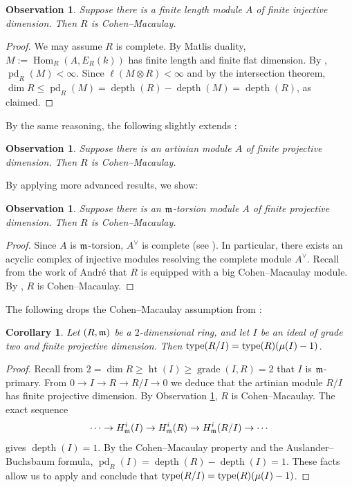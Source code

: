 \documentclass[10. pt,a4paper]{amsart}
\newtheorem{corollary}[theorem]{Corollary}
\newtheorem{observation}[theorem]{Observation}
\theoremstyle{definition}
\theoremstyle{remark}
\newcommand{\pd}{\operatorname{pd}}
\newcommand{\Hom}{\operatorname{Hom}}
\newcommand{\depth}{\operatorname{depth}}
\newcommand{\fm}{\frak{m}}
\begin{document}
\begin{observation}
	Suppose there is a finite length module $A$ of finite injective dimension. Then $R$ is Cohen--Macaulay.
\end{observation}

\begin{proof}
	We may assume $R$ is complete. By Matlis duality, $M := \Hom_R(A, E_R(k))$ has finite length and finite flat dimension. By \cite{GR}, $\pd_R(M) < \infty$. Since $\ell(M \otimes R) < \infty$ and by the intersection theorem, $\dim R \leq \pd_R(M) = \depth(R) - \depth(M) = \depth(R)$, as claimed.
\end{proof}

By the same reasoning, the following slightly extends \cite[6.2.4]{int1}:

\begin{observation}\label{art}
	Suppose there is an artinian module $A$ of finite projective dimension. Then $R$ is Cohen--Macaulay.
\end{observation}

By applying more advanced results, we show:

\begin{observation}\label{art2}
	Suppose there is an $\fm$-torsion module $A$ of finite projective dimension. Then $R$ is Cohen--Macaulay.
\end{observation}

\begin{proof}
	Since $A$ is $\fm$-torsion, $A^\vee$ is complete (see \cite[4.2]{sim}). In particular, there exists an acyclic complex of injective modules resolving the complete module $A^\vee$. Recall from the work of André that $R$ is equipped with a big Cohen--Macaulay module. By \cite[7.6]{sim}, $R$ is Cohen--Macaulay.
\end{proof}

The following drops the Cohen--Macaulay assumption from \cite[Proposition 2.40]{v1}:

\begin{corollary}\label{vps}
	Let $(R,\fm)$ be a $2$-dimensional ring, and let $I$ be an ideal of grade two and finite projective dimension. Then $\operatorname{type}(R/I) = \operatorname{type}(R)(\mu(I) - 1)$.
\end{corollary}

\begin{proof}
	Recall from $2 = \dim R \geq \operatorname{ht}(I) \geq \operatorname{grade}(I,R) = 2$ that $I$ is $\fm$-primary. From $0 \to I \to R \to R/I \to 0$ we deduce that the artinian module $R/I$ has finite projective dimension. By Observation \ref{art}, $R$ is Cohen--Macaulay. The exact sequence
	\[
	\cdots \to H^i_{\fm}(I) \to H^i_{\fm}(R) \to H^i_{\fm}(R/I) \to \cdots
	\]
	gives $\depth(I) = 1$. By the Cohen--Macaulay property and the Auslander--Buchsbaum formula, $\pd_R(I) = \depth(R) - \depth(I) = 1$. These facts allow us to apply \cite[Proposition 2.40]{v1} and conclude that $\operatorname{type}(R/I) = \operatorname{type}(R)(\mu(I) - 1)$.
\end{proof}
\end{document}
